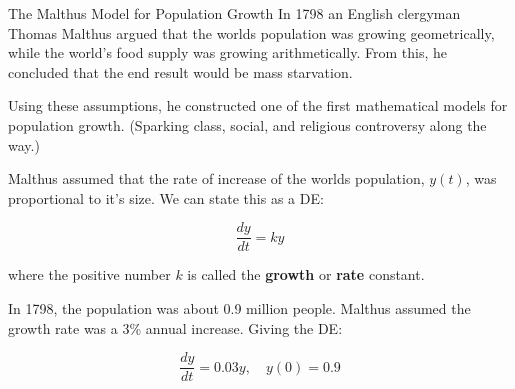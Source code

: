 \documentclass{beamer}
\begin{document}
\begin{frame}
\begin{block}{The Malthus Model for Population Growth}
In 1798 an English clergyman Thomas Malthus argued that the worlds population was growing geometrically, while the world's food supply was growing arithmetically. From this, he concluded that the end result would be mass starvation.\pause

\vspace{1mm}
Using these assumptions, he constructed one of the first mathematical models for population growth. (Sparking class, social, and religious controversy along the way.)\pause

\vspace{1mm}
Malthus assumed that the rate of increase of the worlds population, $y(t)$, was proportional to it's size. We can state this as a DE\@:

\vspace{-2mm}
\begin{equation*}
\dfrac{dy}{dt}=ky
\end{equation*}

\vspace{-1mm}
where the positive number $k$ is called the \textbf{growth} or \textbf{rate} constant.\pause

\vspace{1mm}
In 1798, the population was about 0.9 million people. Malthus assumed the growth rate was a 3\% annual increase. Giving the DE\@:

\vspace{-2mm}
\begin{equation*}
\dfrac{dy}{dt}=0.03y,\quad y(0)=0.9
\end{equation*}
\end{block}
\end{frame}
\end{document}
